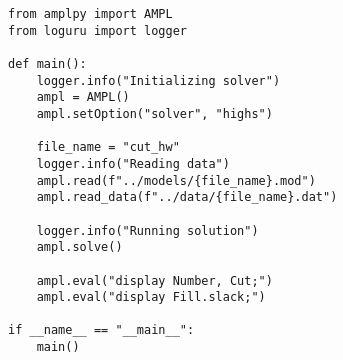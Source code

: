 \begin{verbatim}
from amplpy import AMPL
from loguru import logger

def main():
    logger.info("Initializing solver")
    ampl = AMPL()
    ampl.setOption("solver", "highs")

    file_name = "cut_hw"
    logger.info("Reading data")
    ampl.read(f"../models/{file_name}.mod")
    ampl.read_data(f"../data/{file_name}.dat")

    logger.info("Running solution")
    ampl.solve()

    ampl.eval("display Number, Cut;")
    ampl.eval("display Fill.slack;")

if __name__ == "__main__":
    main()
\end{verbatim}
